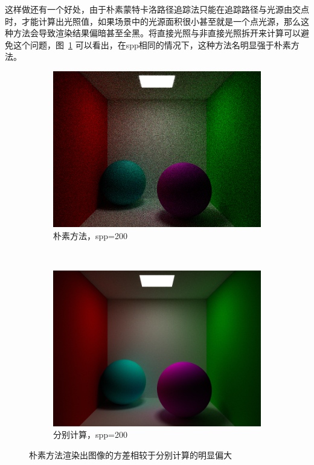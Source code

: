 这样做还有一个好处，由于朴素蒙特卡洛路径追踪法只能在追踪路径与光源由交点时，才能计算出光照值，如果场景中的光源面积很小甚至就是一个点光源，那么这种方法会导致渲染结果偏暗甚至全黑。将直接光照与非直接光照拆开来计算可以避免这个问题，图~\ref{fig:plain_distribution} 可以看出，在spp相同的情况下，这种方法名明显强于朴素方法。
\begin{figure}[h]
    \centering
    \begin{subfigure}{0.4\textwidth}
        \includegraphics[width=\textwidth]{img/plain_mcpt.png}
        \caption{朴素方法，spp=200}
    \end{subfigure}
    ~
    \begin{subfigure}{0.4\textwidth}
        \includegraphics[width=\textwidth]{img/distribution_mcpt.png}
        \caption{分别计算，spp=200}
    \end{subfigure}
    \caption{朴素方法渲染出图像的方差相较于分别计算的明显偏大}
    \label{fig:plain_distribution}
\end{figure}

